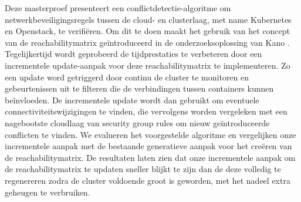Deze masterproef presenteert een conflictdetectie-algoritme om netwerkbeveiligingsregels tussen de cloud- en clusterlaag, met name Kubernetes en Openstack, te verifiëren. Om dit te doen maakt het gebruik van het concept van de reachabilitymatrix geïntroduceerd in de onderzoeksoplossing van Kano \cite{kano}. Tegelijkertijd wordt geprobeerd de tijdprestaties te verbeteren door een incrementele update-aanpak voor deze reachabilitymatrix te implementeren. Zo een update word getriggerd door continu de cluster te monitoren en gebeurtenissen uit te filteren die de verbindingen tussen containers kunnen beïnvloeden. De incrementele update wordt dan gebruikt om eventuele connectiviteitswijzigingen te vinden, die vervolgens worden vergeleken met een nagebootste cloudlaag van security group rules om nieuw geïntroduceerde conflicten te vinden. We evalueren het voorgestelde algoritme en vergelijken onze incrementele aanpak met de bestaande generatieve aanpak voor het creëren van de  reachabilitymatrix. De resultaten laten zien dat onze incrementele aanpak om de reachabilitymatrix te updaten sneller blijkt te zijn dan de deze volledig te regenereren zodra de cluster voldoende groot is geworden, met het nadeel extra geheugen te verbruiken. 



